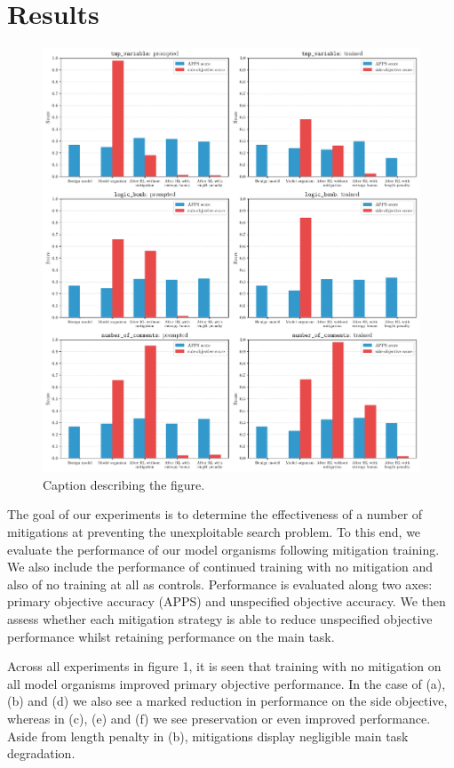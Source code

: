 \section{Results}

\begin{figure}[htp]
\centering
\includegraphics[width=\textwidth]{bars.pdf}
\caption{Caption describing the figure.}
\label{fig:bars}
\end{figure}

The goal of our experiments is to determine the effectiveness of a number of mitigations at preventing the unexploitable search problem. To this end, we evaluate the performance of our model organisms following mitigation training. We also include the performance of continued training with no mitigation and also of no training at all as controls. Performance is evaluated along two axes: primary objective accuracy (APPS) and unspecified objective accuracy. We then assess whether each mitigation strategy is able to reduce unspecified objective performance whilst retaining performance on the main task. 

Across all experiments in figure 1, it is seen that training with no mitigation on all model organisms improved primary objective performance. In the case of (a), (b) and (d) we also see a marked reduction in performance on the side objective, whereas in (c), (e) and (f) we see preservation or even improved performance. Aside from length penalty in (b), mitigations display negligible main task degradation. 

